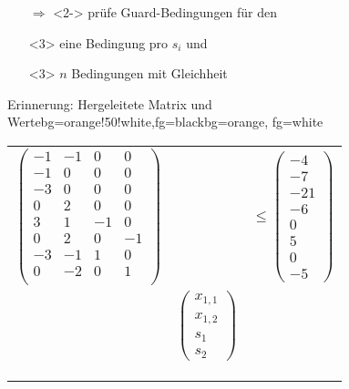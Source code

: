 \begin{frame}
	\begin{itemize}
		\item[$\Rightarrow$]<2-> pr\"ufe Guard-Bedingungen f\"ur den \stem
		\item[]<3> eine Bedingung pro $s_i$ und
		\item[]<3> $n$ Bedingungen mit Gleichheit
		
	\end{itemize}
\end{frame}

\begin{frame}
	\begin{variableblock}{Erinnerung: Hergeleitete Matrix und Werte}{bg=orange!50!white,fg=black}{bg=orange, fg=white}
		\centering
		\begin{tabular}{rll}
			\multirow{2}{*}{$\begin{pmatrix}
				-1 		& -1 		&  0		& 0		 \\
				-1 		& 0 		&  0		& 0		 \\
				-3 		& 0 		&  0		& 0		 \\
				0 		& 2 		&  0		& 0		 \\
				3 		& 1 		&  -1		& 0		 \\
				0 		& 2 		&  0		& -1	 \\
				-3 		& -1 		&  1		& 0		 \\
				0 		& -2 		&  0		& 1	 	 \\
				\end{pmatrix}$}& &\multirow{2}{*}{$ \le \begin{pmatrix}
				-4 \\ -7 \\ -21 \\ -6 \\ 0 \\ 5 \\ 0 \\ -5
				\end{pmatrix} $}\\
			& & \\
			& \multirow{2}{*}{$\begin{pmatrix}
				x_{1,1} \\ x_{1,2} \\ s_{1} \\ s_{2}
				\end{pmatrix} $} & \\
			& & \\
			& & \\
			& & \\
			& & \\

\end{tabular}
\end{variableblock}
\end{frame}
